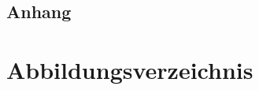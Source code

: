 \documentclass[12pt,a4paper,bibliography=totoc,listof=totoc]{scrartcl}
\begin{document}
\begin{appendix}
\section*{Anhang}
{}


\end{appendix}
\section {Abbildungsverzeichnis}
\listoffigures
\pagebreak

\listoftables
\pagebreak


\renewcommand\refname{Literaturverzeichnis}
\lhead{}
%


\pagebreak
\end{document}
